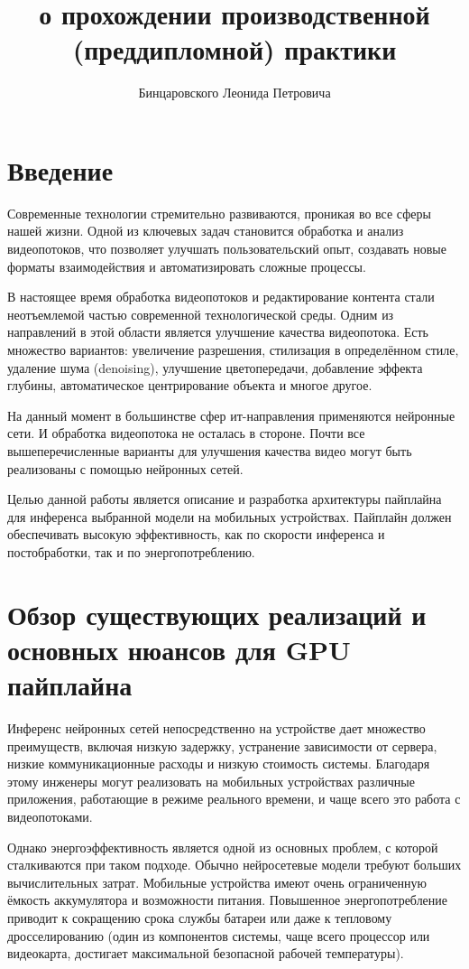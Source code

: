 \documentclass[a4paper,14pt]{extreport}
\title{о прохождении производственной (преддипломной) практики}
\author{Бинцаровского Леонида Петровича}
\begin{document}
    \maketitle\newpage
    
    \tableofcontents\newpage
    \chapter*{Введение}
    Современные технологии стремительно развиваются, проникая во все сферы нашей жизни. Одной из ключевых задач становится обработка и анализ видеопотоков, что позволяет улучшать пользовательский опыт, создавать новые форматы взаимодействия и автоматизировать сложные процессы.
    
    В настоящее время обработка видеопотоков и редактирование контента стали неотъемлемой частью современной технологической среды. Одним из направлений в этой области является улучшение качества видеопотока. Есть множество вариантов: увеличение разрешения, стилизация в определённом стиле, удаление шума (denoising), улучшение цветопередачи, добавление эффекта глубины, автоматическое центрирование объекта и многое другое.

    На данный момент в большинстве сфер ит-направления применяются нейронные сети. И обработка видеопотока не осталась в стороне. Почти все вышеперечисленные варианты для улучшения качества видео могут быть реализованы с помощью нейронных сетей.

    Целью данной работы является описание и разработка архитектуры пайплайна для инференса выбранной модели на мобильных устройствах. Пайплайн должен обеспечивать высокую эффективность, как по скорости инференса и постобработки, так и по энергопотреблению.

    \chapter{Обзор существующих реализаций и основных нюансов для GPU пайплайна}
        Инференс нейронных сетей непосредственно на устройстве дает множество преимуществ, включая низкую задержку, устранение зависимости от сервера, низкие коммуникационные расходы и низкую стоимость системы. Благодаря этому инженеры могут реализовать на мобильных устройствах различные приложения, работающие в режиме реального времени, и чаще всего это работа с видеопотоками.
    
        Однако энергоэффективность является одной из основных проблем, с которой сталкиваются при таком подходе. Обычно нейросетевые модели требуют больших вычислительных затрат. Мобильные устройства имеют очень ограниченную ёмкость аккумулятора и возможности питания. Повышенное энергопотребление приводит к сокращению срока службы батареи или даже к тепловому дросселированию (один из компонентов системы, чаще всего процессор или видеокарта, достигает максимальной безопасной рабочей температуры).
\end{document}

